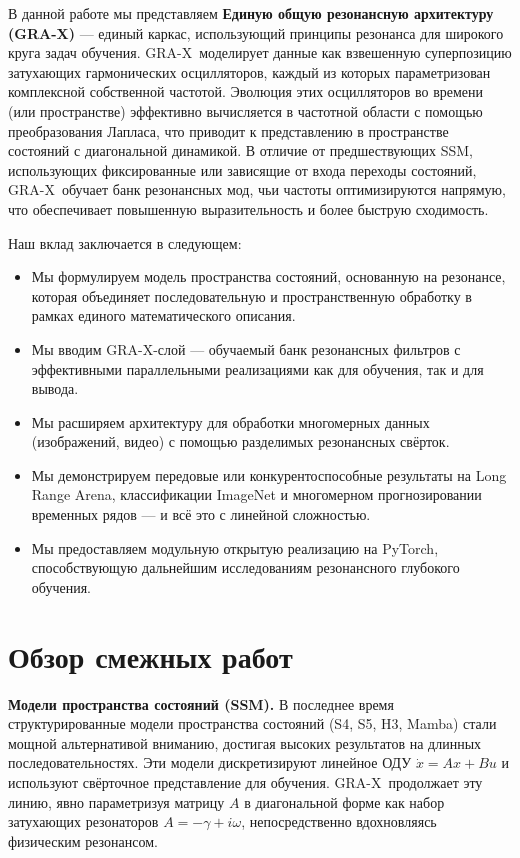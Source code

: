 \documentclass{article}
\newcommand{\GRA}{\textsc{GRA-X}}
\begin{document}
В данной работе мы представляем \textbf{Единую общую резонансную архитектуру (\GRA)} — единый каркас, использующий принципы резонанса для широкого круга задач обучения.
\GRA\ моделирует данные как взвешенную суперпозицию затухающих гармонических осцилляторов, каждый из которых параметризован комплексной собственной частотой.
Эволюция этих осцилляторов во времени (или пространстве) эффективно вычисляется в частотной области с помощью преобразования Лапласа, что приводит к представлению в пространстве состояний с диагональной динамикой.
В отличие от предшествующих SSM, использующих фиксированные или зависящие от входа переходы состояний, \GRA\ обучает банк резонансных мод, чьи частоты оптимизируются напрямую, что обеспечивает повышенную выразительность и более быструю сходимость.

Наш вклад заключается в следующем:
\begin{itemize}
  \item Мы формулируем модель пространства состояний, основанную на резонансе, которая объединяет последовательную и пространственную обработку в рамках единого математического описания.
  \item Мы вводим \GRA-слой — обучаемый банк резонансных фильтров с эффективными параллельными реализациями как для обучения, так и для вывода.
  \item Мы расширяем архитектуру для обработки многомерных данных (изображений, видео) с помощью разделимых резонансных свёрток.
  \item Мы демонстрируем передовые или конкурентоспособные результаты на Long Range Arena, классификации ImageNet и многомерном прогнозировании временных рядов — и всё это с линейной сложностью.
  \item Мы предоставляем модульную открытую реализацию на PyTorch, способствующую дальнейшим исследованиям резонансного глубокого обучения.
\end{itemize}

\section{Обзор смежных работ}
\label{sec:related}

\textbf{Модели пространства состояний (SSM).}
В последнее время структурированные модели пространства состояний (S4, S5, H3, Mamba) стали мощной альтернативой вниманию, достигая высоких результатов на длинных последовательностях.
Эти модели дискретизируют линейное ОДУ \(\dot{x} = A x + B u\) и используют свёрточное представление для обучения.
\GRA\ продолжает эту линию, явно параметризуя матрицу \(A\) в диагональной форме как набор затухающих резонаторов \(A = -\gamma + i\omega\), непосредственно вдохновляясь физическим резонансом.
\end{document}
